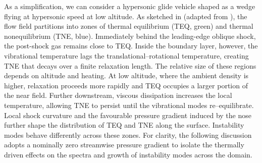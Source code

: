 As a simplification, we can consider a hypersonic glide vehicle shaped as a wedge flying at hypersonic speed at low altitude. As sketched in  (adapted from \citet{williams2021}), the flow field partitions into zones of thermal equilibrium (\gls{TEQ}, green) and thermal nonequilibrium (\gls{TNE}, blue). Immediately behind the leading-edge oblique shock, the post-shock gas remains close to \gls{TEQ}. Inside the boundary layer, however, the vibrational temperature lags the translational–rotational temperature, creating \gls{TNE} that decays over a finite relaxation length. The relative size of these regions depends on altitude and heating. At low altitude, where the ambient density is higher, relaxation proceeds more rapidly and \gls{TEQ} occupies a larger portion of the near field. Further downstream, viscous dissipation increases the local temperature, allowing \gls{TNE} to persist until the vibrational modes re--equilibrate. Local shock curvature and the favourable pressure gradient induced by the nose further shape the distribution of \gls{TEQ} and \gls{TNE} along the surface. Instability modes behave differently across these zones. For clarity, the following discussion adopts a nominally zero streamwise pressure gradient to isolate the thermally driven effects on the spectra and growth of instability modes across the domain.



